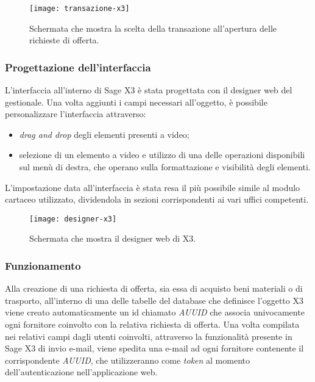 \begin{figure}[htbp]
	\begin{center}
		\texttt{[image: transazione-x3]}
		\caption{Schermata che mostra la scelta della transazione all'apertura delle richieste di offerta.}
	\end{center}
\end{figure}

\subsubsection{Progettazione dell'interfaccia}
L'interfaccia all'interno di Sage X3 è stata progettata con il designer web del gestionale.
Una volta aggiunti i campi necessari all'oggetto, è possibile personalizzare l'interfaccia attraverso:
\begin{itemize}
	\item \textit{drag and drop} degli elementi presenti a video;
	\item  selezione di un elemento a video e utilizzo di una delle operazioni disponibili sul menù di destra, che operano sulla formattazione e visibilità degli elementi.
\end{itemize}
L'impostazione data all'interfaccia è stata resa il più possibile simile al modulo cartaceo utilizzato, dividendola in sezioni corrispondenti ai vari uffici competenti.

\begin{figure}[htbp]
	\begin{center}
		\texttt{[image: designer-x3]}
		\caption{Schermata che mostra il designer web di X3.}
	\end{center}
\end{figure}

\subsubsection{Funzionamento}
Alla creazione di una richiesta di offerta, sia essa di acquisto beni materiali o di trasporto, all'interno di una delle tabelle del database che definisce l'oggetto X3 viene creato automaticamente un id chiamato \textit{AUUID} che associa univocamente ogni fornitore coinvolto con la relativa richiesta di offerta.
Una volta compilata nei relativi campi dagli utenti coinvolti, attraverso la funzionalità presente in Sage X3 di invio e-mail, viene spedita una e-mail ad ogni fornitore contenente il corrispondente \textit{AUUID}, che utilizzeranno come \textit{token} al momento dell'autenticazione nell'applicazione web.

